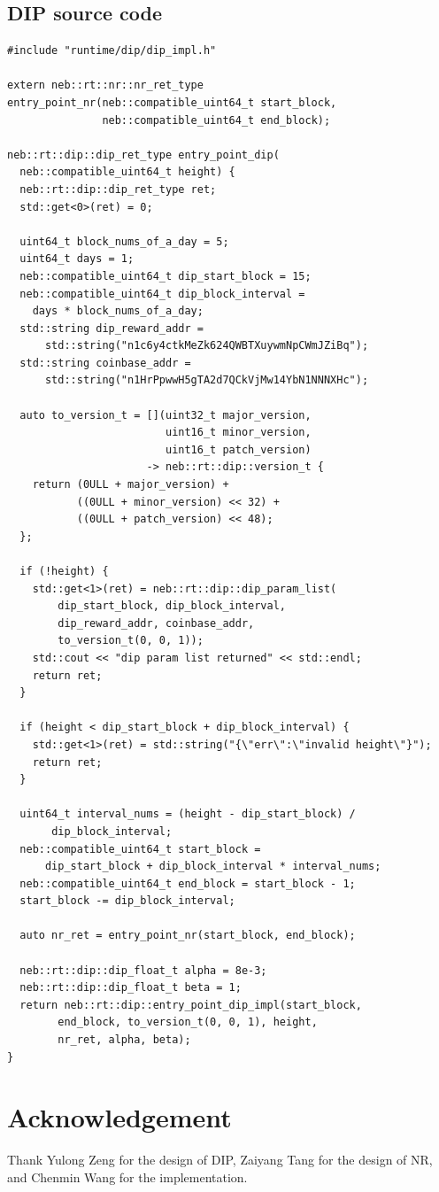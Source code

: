 \documentclass[11pt]{article}
\begin{document}
\subsection{DIP source code}
\begin{lstlisting}
#include "runtime/dip/dip_impl.h"

extern neb::rt::nr::nr_ret_type
entry_point_nr(neb::compatible_uint64_t start_block,
               neb::compatible_uint64_t end_block);

neb::rt::dip::dip_ret_type entry_point_dip(
  neb::compatible_uint64_t height) {
  neb::rt::dip::dip_ret_type ret;
  std::get<0>(ret) = 0;

  uint64_t block_nums_of_a_day = 5;
  uint64_t days = 1;
  neb::compatible_uint64_t dip_start_block = 15;
  neb::compatible_uint64_t dip_block_interval =
    days * block_nums_of_a_day;
  std::string dip_reward_addr =
      std::string("n1c6y4ctkMeZk624QWBTXuywmNpCWmJZiBq");
  std::string coinbase_addr =
      std::string("n1HrPpwwH5gTA2d7QCkVjMw14YbN1NNNXHc");

  auto to_version_t = [](uint32_t major_version,
                         uint16_t minor_version,
                         uint16_t patch_version)
                      -> neb::rt::dip::version_t {
    return (0ULL + major_version) +
           ((0ULL + minor_version) << 32) +
           ((0ULL + patch_version) << 48);
  };

  if (!height) {
    std::get<1>(ret) = neb::rt::dip::dip_param_list(
        dip_start_block, dip_block_interval,
        dip_reward_addr, coinbase_addr,
        to_version_t(0, 0, 1));
    std::cout << "dip param list returned" << std::endl;
    return ret;
  }

  if (height < dip_start_block + dip_block_interval) {
    std::get<1>(ret) = std::string("{\"err\":\"invalid height\"}");
    return ret;
  }

  uint64_t interval_nums = (height - dip_start_block) /
       dip_block_interval;
  neb::compatible_uint64_t start_block =
      dip_start_block + dip_block_interval * interval_nums;
  neb::compatible_uint64_t end_block = start_block - 1;
  start_block -= dip_block_interval;

  auto nr_ret = entry_point_nr(start_block, end_block);

  neb::rt::dip::dip_float_t alpha = 8e-3;
  neb::rt::dip::dip_float_t beta = 1;
  return neb::rt::dip::entry_point_dip_impl(start_block,
        end_block, to_version_t(0, 0, 1), height,
        nr_ret, alpha, beta);
}
\end{lstlisting}


\section{Acknowledgement}
Thank Yulong Zeng for the design of DIP, Zaiyang Tang for the design of NR, and
Chenmin Wang for the implementation.
\end{document}
